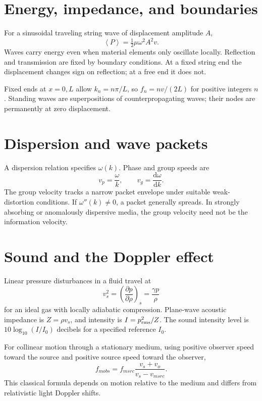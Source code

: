 \documentclass[11pt,oneside]{book}
\newcommand{\dd}{\mathrm{d}}
\newcommand{\avg}[1]{\left\langle #1\right\rangle}
\newcommand{\pd}[2]{\frac{\partial #1}{\partial #2}}
\newcommand{\od}[2]{\frac{\dd #1}{\dd #2}}
\theoremstyle{reviewstyle}
\begin{document}
\section{Energy, impedance, and boundaries}
For a sinusoidal traveling string wave of displacement amplitude $A$,
\begin{equation}
\avg{P}=\tfrac12\mu\omega^2A^2v.
\end{equation}
Waves carry energy even when material elements only oscillate locally. Reflection and transmission are fixed by boundary conditions. At a fixed string end the displacement changes sign on reflection; at a free end it does not.

Fixed ends at $x=0,L$ allow $k_n=n\pi/L$, so $f_n=nv/(2L)$ for positive integers $n$. Standing waves are superpositions of counterpropagating waves; their nodes are permanently at zero displacement.
\section{Dispersion and wave packets}
A dispersion relation specifies $\omega(k)$. Phase and group speeds are
\begin{equation}
v_p=\frac{\omega}{k},\qquad v_g=\od{\omega}{k}.
\end{equation}
The group velocity tracks a narrow packet envelope under suitable weak-distortion conditions. If $\omega''(k)\neq0$, a packet generally spreads. In strongly absorbing or anomalously dispersive media, the group velocity need not be the information velocity.
\section{Sound and the Doppler effect}
Linear pressure disturbances in a fluid travel at
\begin{equation}
v_s^2=\left(\pd{p}{\rho}\right)_s=\frac{\gamma p}{\rho}
\end{equation}
for an ideal gas with locally adiabatic compression. Plane-wave acoustic impedance is $Z=\rho v_s$, and intensity is $I=p_{\rm rms}^2/Z$. The sound intensity level is $10\log_{10}(I/I_0)$ decibels for a specified reference $I_0$.

For collinear motion through a stationary medium, using positive observer speed toward the source and positive source speed toward the observer,
\begin{equation}f_{
m obs}=f_{
m src}\frac{v_s+v_o}{v_s-v_{
m src}}.\end{equation}
This classical formula depends on motion relative to the medium and differs from relativistic light Doppler shifts.
\end{document}

